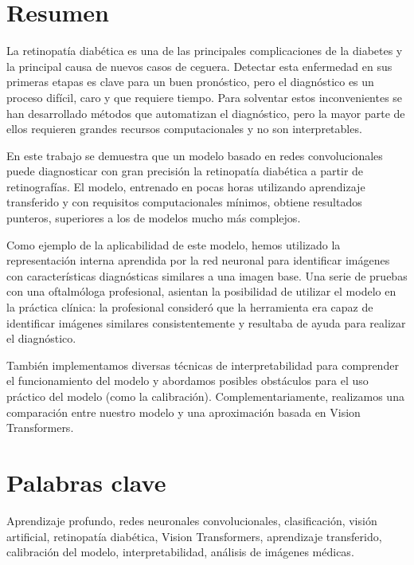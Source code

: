 
\newpage

\thispagestyle{empty}

\section*{Resumen}
La retinopatía diabética es una de las principales complicaciones de la diabetes y la principal causa de nuevos casos de ceguera. Detectar esta enfermedad en sus primeras etapas es clave para un buen pronóstico, pero el diagnóstico es un proceso difícil, caro y que requiere tiempo. Para solventar estos inconvenientes se han desarrollado métodos que automatizan el diagnóstico, pero la mayor parte de ellos requieren grandes recursos computacionales y no son interpretables.

En este trabajo se demuestra que un modelo basado en redes convolucionales puede diagnosticar con gran precisión la retinopatía diabética a partir de  retinografías. El modelo, entrenado en pocas horas utilizando aprendizaje transferido y con requisitos computacionales mínimos, obtiene resultados punteros, superiores a los de modelos mucho más complejos.

Como ejemplo de la aplicabilidad de este modelo, hemos utilizado la representación interna aprendida por la red neuronal para identificar imágenes con características diagnósticas similares a una imagen base. Una serie de pruebas con una oftalmóloga profesional, asientan la posibilidad de utilizar el modelo en la práctica clínica: la profesional consideró que la herramienta era capaz de identificar imágenes similares consistentemente y resultaba de ayuda para realizar el diagnóstico.

También implementamos diversas técnicas de interpretabilidad para comprender el funcionamiento del modelo y abordamos posibles obstáculos para el uso práctico del modelo (como la calibración). Complementariamente, realizamos una comparación entre nuestro modelo y una aproximación basada en Vision Transformers. 

\section*{Palabras clave}
Aprendizaje profundo, redes neuronales convolucionales, clasificación, visión artificial, retinopatía diabética, Vision Transformers, aprendizaje transferido, calibración del modelo, interpretabilidad, análisis de imágenes médicas.
